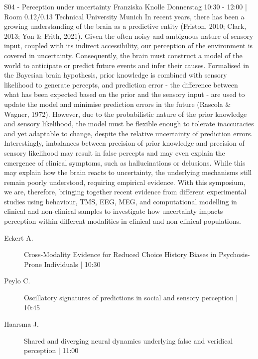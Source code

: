 
            \begin{symposium}
            {S04 - Perception under uncertainty}
            { Franziska Knolle}
            {Donnerstag 10:30 - 12:00 | Room 0.12/0.13}
            {Technical University Munich}
            In recent years, there has been a growing understanding of the brain as a predictive entity (Friston, 2010; Clark, 2013; Yon \& Frith, 2021). Given the often noisy and ambiguous nature of sensory input, coupled with its indirect accessibility, our perception of the environment is covered in uncertainty. Consequently, the brain must construct a model of the world to anticipate or predict future events and infer their causes. Formalised in the Bayesian brain hypothesis, prior knowledge is combined with sensory likelihood to generate percepts, and prediction error - the difference between what has been expected based on the prior and the sensory input - are used to update the model and minimise prediction errors in the future (Rascola \& Wagner, 1972). However, due to the probabilistic nature of the prior knowledge and sensory likelihood, the model must be flexible enough to tolerate inaccuracies and yet adaptable to change, despite the relative uncertainty of prediction errors. Interestingly, imbalances between precision of prior knowledge and precision of sensory likelihood may result in false percepts and may even explain the emergence of clinical symptoms, such as hallucinations or delusions. While this may explain how the brain reacts to uncertainty, the underlying mechanisms still remain poorly understood, requiring empirical evidence.
With this symposium, we are, therefore, bringing together recent evidence from different experimental studies using behaviour, TMS, EEG, MEG, and computational modelling in clinical and non-clinical samples to investigate how uncertainty impacts perception within different modalities in clinical and non-clinical populations.
            \begin{description}    
            
                \item [ Eckert A.] Cross-Modality Evidence for Reduced Choice History Biases in Psychosis-Prone Individuals  \textcolor{mygray}{ | 10:30}    
                
                \item [ Peylo C.] Oscillatory signatures of predictions in social and sensory perception  \textcolor{mygray}{ | 10:45}    
                
                \item [ Haarsma J.] Shared and diverging neural dynamics underlying false and veridical perception  \textcolor{mygray}{ | 11:00}    
                

\end{description}
\end{symposium}
